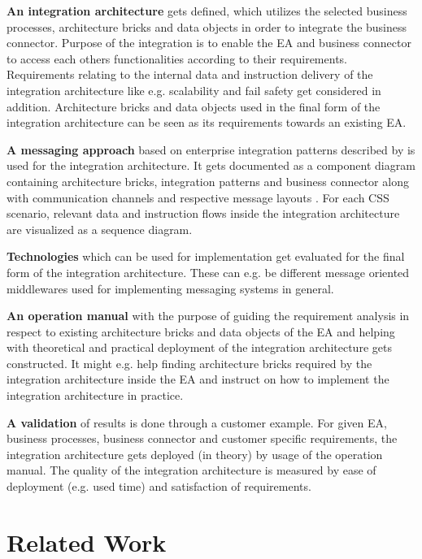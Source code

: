 \documentclass{article}
\begin{document}
\textbf{An integration architecture} gets defined, which utilizes the selected business processes, architecture 
bricks and data objects in order to integrate the business connector. Purpose of the integration is to enable 
the EA and business connector to access each others functionalities according to their requirements.
Requirements relating to the internal data and instruction delivery of the integration architecture 
like e.g. scalability and fail safety get considered in addition.
Architecture bricks and data objects used in the final form of the 
integration architecture can be seen as its requirements towards an existing EA.

\textbf{A messaging approach} based on enterprise integration patterns described
by \textcite{integrationPatterns} is used for the integration architecture.
It gets documented as a component diagram
containing architecture bricks, integration patterns and business connector along with communication 
channels and respective message layouts \cite[cf. 16 ff.]{integrationPatterns}.
For each CSS scenario, relevant data and instruction flows inside the integration architecture 
are visualized as a sequence diagram.

\textbf{Technologies} which can be used for implementation get evaluated for the final form of the integration architecture.
These can e.g. be different message oriented middlewares used for implementing messaging systems in general.

\textbf{An operation manual} with the purpose of guiding the requirement analysis in respect to existing architecture bricks and data 
objects of the EA and helping with theoretical and practical deployment of the integration architecture gets constructed.
It might e.g. help finding architecture bricks required by the integration architecture inside the EA 
and instruct on how to implement the integration architecture in practice.

\textbf{A validation} of results is done through a customer example. For given 
EA, business processes, business connector and customer specific requirements, the integration architecture gets 
deployed (in theory) by usage of the operation manual.
The quality of the integration architecture is measured by ease of deployment (e.g. used time) and 
satisfaction of requirements.

\section{Related Work}
\end{document}

